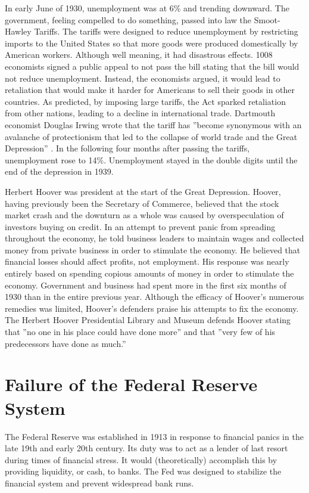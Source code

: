 \documentclass[12pt]{article}
\begin{document}
In early June of 1930, unemployment was at 6\% and trending downward. The
government, feeling compelled to do something, passed into law the Smoot-Hawley
Tariffs. The tariffs were designed to reduce unemployment by restricting
imports to the United States so that more goods were produced domestically by
American workers. Although well meaning, it had disastrous effects. 1008
economists signed a public appeal to not pass the bill stating that the bill
would not reduce unemployment\autocite{economistssmoothawley}. Instead, the
economists argued, it would lead to retaliation that would make it harder for
Americans to sell their goods in other countries. As predicted, by imposing
large tariffs, the Act sparked retaliation from other nations, leading to a
decline in international trade. Dartmouth economist Douglas Irwing wrote that
the tariff has ”become synonymous with an avalanche of protectionism that led
to the collapse of world trade and the Great Depression”
\autocite{peddlingprotectionism}. In the following four months after passing
the tariffs, unemployment rose to 14\%\autocite{nber}. Unemployment stayed in
the double digits until the end of the depression in 1939.

Herbert Hoover was president at the start of the Great Depression. Hoover,
having previously been the Secretary of Commerce, believed that the stock
market crash and the downturn as a whole was caused by overspeculation of
investors buying on credit. In an attempt to prevent panic from spreading
throughout the economy, he told business leaders to maintain wages and
collected money from private business in order to stimulate the economy. He
believed that financial losses should affect profits, not employment. His
response was nearly entirely based on spending copious amounts of money in
order to stimulate the economy. Government and business had spent more in the
first six months of 1930 than in the entire previous year.\autocite{hhplm} 
Although the efficacy of Hoover’s numerous remedies was limited, Hoover’s
defenders praise his attempts to fix the economy. The Herbert Hoover
Presidential Library and Museum defends Hoover stating that ”no one in his
place could have done more” and that ”very few of his predecessors have done as
much.”

\section{Failure of the Federal Reserve System}

The Federal Reserve was established in 1913 in response to financial panics in
the late 19th and early 20th century. Its duty was to act as a lender of last
resort during times of financial stress. It would (theoretically) accomplish
this by providing liquidity, or cash, to banks. The Fed was designed to
stabilize the financial system and prevent widespread bank runs.
\end{document}
